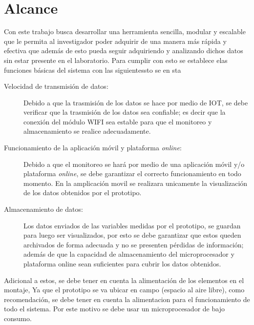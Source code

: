 \chapter{Alcance}
Con este trabajo busca desarrollar una herramienta sencilla, modular y escalable que le permita al investigador poder adquirir de una manera más rápida y efectiva  que además de esto pueda seguir adquiriendo y analizando dichos datos sin estar presente en el laboratorio. Para cumplir con esto se establece elas funciones básicas del sistema con las siguientessto se en sta   

\begin{description}

\item[Velocidad de transmisión de datos:] Debido a que la trasmisión de los datos se hace por medio de IOT, se debe verificar que la trasmisión de los datos sea confiable; es decir que la conexión del módulo WIFI sea estable para que el monitoreo y almacenamiento se realice adecuadamente.

\item[Funcionamiento de la aplicación móvil y plataforma \textit{online}:]Debido a que el monitoreo se hará por medio de una aplicación móvil y/o plataforma \textit{online}, se debe garantizar el correcto funcionamiento en todo momento. En la amplicación movil se realizara unicamente la visualización de los datos obtenidos por el prototipo. 

\item[Almacenamiento de datos:]Los datos enviados de las variables medidas por el prototipo, se guardan para luego ser visualizados, por esto se debe garantizar que estos queden archivados de forma adecuada y no se presenten pérdidas de información; además de que la capacidad de almacenamiento del microprocesador y plataforma online sean suficientes para cubrir los datos obtenidos.
\end{description} 

Adicional a estos, se debe tener en cuenta la alimentación de los elementos en el montaje, Ya que el prototipo se va ubicar en campo (espacio al aire libre), como recomendación, se debe tener en cuenta la alimentacion para el funcionamiento de todo el sistema. Por este motivo se debe usar un microprocesador de bajo consumo. 

 
 
 
  
  
